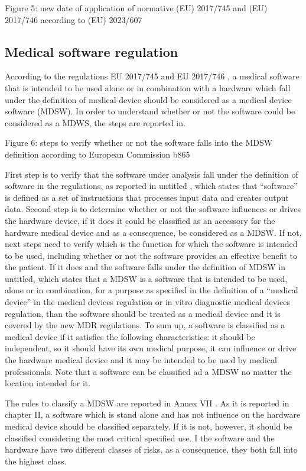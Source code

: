\documentclass{Configuration_Files/PoliMi3i_thesis}
\begin{document}
Figure 5: new date of application of normative (EU) 2017/745 and (EU) 2017/746 according to (EU) 2023/607 \cite{NewRevisedResource}

\subsection{Medical software regulation}

According to the regulations EU 2017/745 \cite{RegolamentoUE20172017} and EU 2017/746 \cite{RegolamentoUE20172017a}, a medical software that is intended to be used alone or in combination with a hardware which fall under the definition of medical device should be considered as a medical device software (MDSW). 
In order to understand whether or not the software could be considered as a MDWS, the steps are reported in.

Figure 6: steps to verify whether or not the software falls into the MDSW definition according to European Commission \cite{} b865

First step is to verify that the software under analysis fall under the definition of software in the regulations, as reported in \cite{} untitled , which states that “software” is defined as a set of instructions that processes input data and creates output data. Second step is to determine whether or not the software influences or drives the hardware device, if it does it could be classified as an accessory for the hardware medical device and as a consequence, be considered as a MDSW. If not, next steps need to verify which is the function for which the software is intended to be used, including whether or not the software provides an effective benefit to the patient. If it does and the software falls under the definition of MDSW in \cite{} untitled, which states that a MDSW is a software that is intended to be used, alone or in combination, for a purpose as specified in the definition of a “medical device” in the medical devices regulation or in vitro diagnostic medical devices regulation, than the software should be treated as a medical device and it is covered by the new MDR regulations.
To sum up, a software is classified as a medical device if it satisfies the following characteristics: it should be independent, so it should have its own medical purpose, it can influence or drive the hardware medical device and it may be intended to be used by medical professionals. Note that a software can be classified ad a MDSW no matter the location intended for it.

The rules to classify a MDSW are reported in Annex VII \cite{massimopANNEXVIII2019}. As it is reported in chapter II, a software which is stand alone and has not influence on the hardware medical device should be classified separately. If it is not, however, it should be classified considering the most critical specified use. I the software and the hardware have two different classes of risks, as a consequence, they both fall into the highest class.
\end{document}
